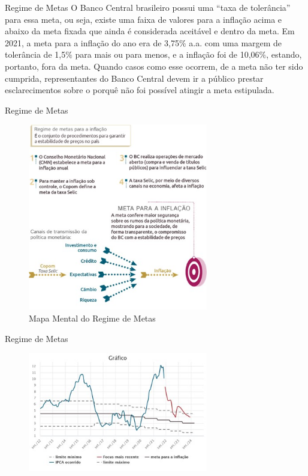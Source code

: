 \documentclass[xcolor=dvipsnames]{beamer}
\begin{document}
\begin{frame}{Regime de Metas}
O Banco Central brasileiro possui uma “taxa de tolerância” para essa meta, ou seja, existe uma faixa de valores para a inflação acima e abaixo da meta fixada que ainda é considerada aceitável e dentro da meta. Em 2021, a meta para a inflação do ano era de 3,75$\%$ a.a. com uma margem de tolerância de 1,5$\%$ para mais ou para menos, e a inflação foi de 10,06$\%$, estando, portanto, fora da meta. Quando casos como esse ocorrem, de a meta não ter sido cumprida, representantes do Banco Central devem ir a público prestar esclarecimentos sobre o porquê não foi possível atingir a meta estipulada.
    
\end{frame}
\begin{frame}{Regime de Metas}
\begin{figure}
    \centering
    \includegraphics[width=0.70\textwidth]{Figuras/metasinflacao.jpg}
    \caption{Mapa Mental do Regime de Metas}
    \label{fig:my_label}
\end{figure}
    
\end{frame}
\begin{frame}{Regime de Metas}
\begin{figure}
    \centering
    \includegraphics[width=0.70\textwidth]{Figuras/graficomonetaria.jpg}
    \caption{}
    \label{fig:my_label}
\end{figure}
    
\end{frame}
\end{document}
